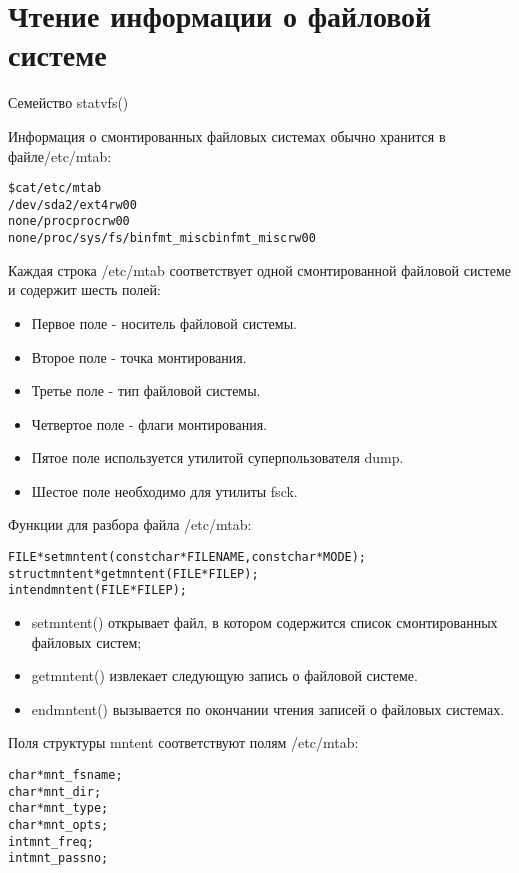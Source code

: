 \documentclass{beamer}
\begin{document}
\section{Чтение информации о файловой системе}

\begin{frame}[fragile]{Семейство statvfs()}
\begin{block}{Информация о смонтированных файловых системах обычно хранится в файле/etc/mtab:}
\begin{alltt}
\$ cat /etc/mtab
/dev/sda2 / ext4 rw 0 0
none /proc proc rw 0 0
none /proc/sys/fs/binfmt_misc binfmt_misc rw 0 0
\end{alltt}
\end{block}
Каждая строка /etc/mtab соответствует одной смонтированной файловой системе и содержит шесть полей:
\begin{itemize}
\item Первое поле - носитель файловой системы.
\item Второе поле - точка монтирования.
\item Третье поле - тип файловой системы.
\item Четвертое поле - флаги монтирования.
\item Пятое поле используется утилитой суперпользователя dump.
\item Шестое поле необходимо для утилиты fsck.
\end{itemize}
\end{frame}

\begin{frame}[fragile]
\begin{block}{Функции для разбора файла /etc/mtab:}
\begin{alltt}
FILE * setmntent (const char * FILENAME, const char * MODE);
struct mntent * getmntent (FILE * FILEP);
int endmntent (FILE * FILEP);
\end{alltt}
\end{block}
\begin{itemize}
\item setmntent() открывает файл, в котором содержится список смонтированных файловых систем;
\item getmntent() извлекает следующую запись о файловой системе. 
\item endmntent() вызывается по окончании чтения записей о файловых системах.
\end{itemize}
Поля структуры mntent соответствуют полям /etc/mtab:
\begin{alltt}
  char *mnt_fsname;
  char *mnt_dir;
  char *mnt_type;
  char *mnt_opts;
  int mnt_freq;
  int mnt_passno;
\end{alltt}
\end{frame}
\end{document}

